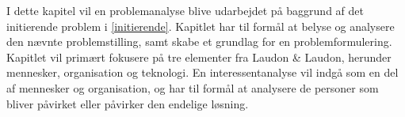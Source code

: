I dette kapitel vil en problemanalyse blive udarbejdet på baggrund af det initierende problem i \cref{initierende}. Kapitlet har til formål at belyse og analysere den nævnte problemstilling, samt skabe et grundlag for en problemformulering. Kapitlet vil primært fokusere på tre elementer fra Laudon \& Laudon, herunder mennesker, organisation og teknologi. En interessentanalyse vil indgå som en del af mennesker og organisation, og har til formål at analysere de personer som bliver påvirket eller påvirker den endelige løsning. 
